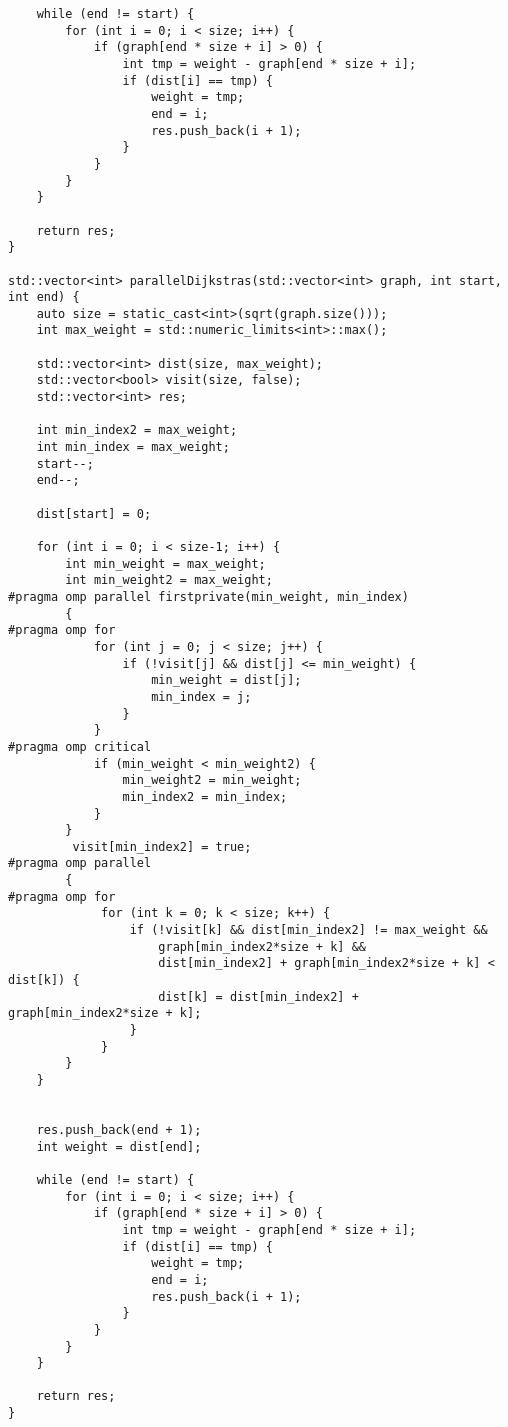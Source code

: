 \documentclass{report}
\begin{document}
\begin{lstlisting}
    while (end != start) {
        for (int i = 0; i < size; i++) {
            if (graph[end * size + i] > 0) {
                int tmp = weight - graph[end * size + i];
                if (dist[i] == tmp) {
                    weight = tmp;
                    end = i;
                    res.push_back(i + 1);
                }
            }
        }
    }

    return res;
}

std::vector<int> parallelDijkstras(std::vector<int> graph, int start, int end) {
    auto size = static_cast<int>(sqrt(graph.size()));
    int max_weight = std::numeric_limits<int>::max();

    std::vector<int> dist(size, max_weight);
    std::vector<bool> visit(size, false);
    std::vector<int> res;

    int min_index2 = max_weight;
    int min_index = max_weight;
    start--;
    end--;

    dist[start] = 0;

    for (int i = 0; i < size-1; i++) {
        int min_weight = max_weight;
        int min_weight2 = max_weight;
#pragma omp parallel firstprivate(min_weight, min_index)
        {
#pragma omp for
            for (int j = 0; j < size; j++) {
                if (!visit[j] && dist[j] <= min_weight) {
                    min_weight = dist[j];
                    min_index = j;
                }
            }
#pragma omp critical
            if (min_weight < min_weight2) {
                min_weight2 = min_weight;
                min_index2 = min_index;
            }
        }
         visit[min_index2] = true;
#pragma omp parallel
        {
#pragma omp for
             for (int k = 0; k < size; k++) {
                 if (!visit[k] && dist[min_index2] != max_weight &&
                     graph[min_index2*size + k] &&
                     dist[min_index2] + graph[min_index2*size + k] < dist[k]) {
                     dist[k] = dist[min_index2] + graph[min_index2*size + k];
                 }
             }
        }
    }


    res.push_back(end + 1);
    int weight = dist[end];

    while (end != start) {
        for (int i = 0; i < size; i++) {
            if (graph[end * size + i] > 0) {
                int tmp = weight - graph[end * size + i];
                if (dist[i] == tmp) {
                    weight = tmp;
                    end = i;
                    res.push_back(i + 1);
                }
            }
        }
    }

    return res;
}


\end{lstlisting}
\end{document}
